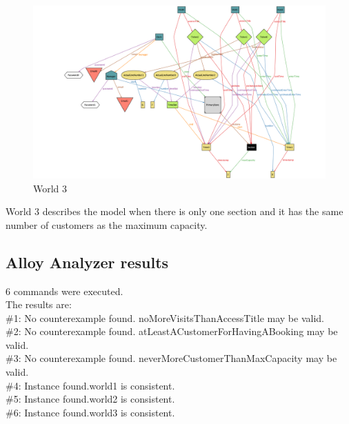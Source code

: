 \begin{figure}[H]
    \centering
    \hspace*{-3.5cm}
    \includegraphics[height=0.7\textwidth]{Images/world3.png}
    \caption{World 3}
\end{figure}

World 3 describes the model when there is only one section and it has the same number of customers as the maximum capacity.

\subsection{Alloy Analyzer results}

6 commands were executed.\\
The results are:\\
\#1: No counterexample found. noMoreVisitsThanAccessTitle may be valid.\\
\#2: No counterexample found. atLeastACustomerForHavingABooking may be valid.\\
\#3: No counterexample found. neverMoreCustomerThanMaxCapacity may be valid.\\
\#4: Instance found.world1 is consistent.\\
\#5: Instance found.world2 is consistent.\\
\#6: Instance found.world3 is consistent.\\
